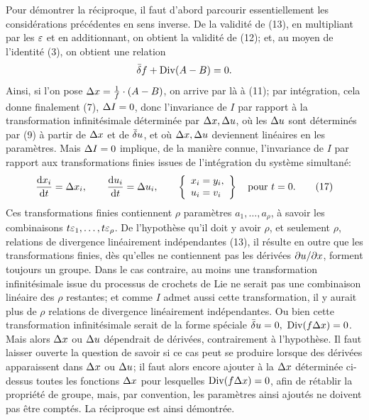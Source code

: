Pour démontrer la réciproque, il faut d'abord parcourir essentiellement les considérations précédentes en sens inverse. De la validité de (13), en multipliant par les \(\varepsilon\) et en additionnant, on obtient la validité de (12); et, au moyen de l'identité (3), on obtient une relation
\[
\bar{\delta} f+\operatorname{Div}(A-B)=0.
\]
Ainsi, si l'on pose \(\Delta x=\frac1f\cdot(A-B)\), on arrive par là à (11); par intégration, cela donne finalement (7), \(\Delta I=0\), donc l'invariance de \(I\) par rapport à la transformation infinitésimale déterminée par \(\Delta x,\Delta u\), où les \(\Delta u\) sont déterminés par (9) à partir de \(\Delta x\) et de \(\bar{\delta} u\), et où \(\Delta x,\Delta u\) deviennent linéaires en les paramètres. Mais \(\Delta I=0\) implique, de la manière connue, l'invariance de \(I\) par rapport aux transformations finies issues de l'intégration du système simultané:
\begin{equation}
\frac{\mathrm d x_i}{\mathrm d t}=\Delta x_i,\qquad
\frac{\mathrm d u_i}{\mathrm d t}=\Delta u_i,\qquad
\left\{\begin{array}{l}
x_i=y_i,\\
u_i=v_i
\end{array}\right\}
\quad\text{pour }t=0.
\tag{17}
\end{equation}
Ces transformations finies contiennent \(\rho\) paramètres \(a_1,\ldots,a_\rho\), à savoir les combinaisons \(t\varepsilon_1,\ldots,t\varepsilon_\rho\). De l'hypothèse qu'il doit y avoir \(\rho\), et seulement \(\rho\), relations de divergence linéairement indépendantes (13), il résulte en outre que les transformations finies, dès qu'elles ne contiennent pas les dérivées \(\partial u/\partial x\), forment toujours un groupe. Dans le cas contraire, au moins une transformation infinitésimale issue du processus de crochets de Lie ne serait pas une combinaison linéaire des \(\rho\) restantes; et comme \(I\) admet aussi cette transformation, il y aurait plus de \(\rho\) relations de divergence linéairement indépendantes. Ou bien cette transformation infinitésimale serait de la forme spéciale \(\bar{\delta} u=0,\ \operatorname{Div}(f\Delta x)=0\). Mais alors \(\Delta x\) ou \(\Delta u\) dépendrait de dérivées, contrairement à l'hypothèse. Il faut laisser ouverte la question de savoir si ce cas peut se produire lorsque des dérivées apparaissent dans \(\Delta x\) ou \(\Delta u\); il faut alors encore ajouter à la \(\Delta x\) déterminée ci-dessus toutes les fonctions \(\Delta x\) pour lesquelles \(\operatorname{Div}(f\Delta x)=0\), afin de rétablir la propriété de groupe, mais, par convention, les paramètres ainsi ajoutés ne doivent pas être comptés. La réciproque est ainsi démontrée.


